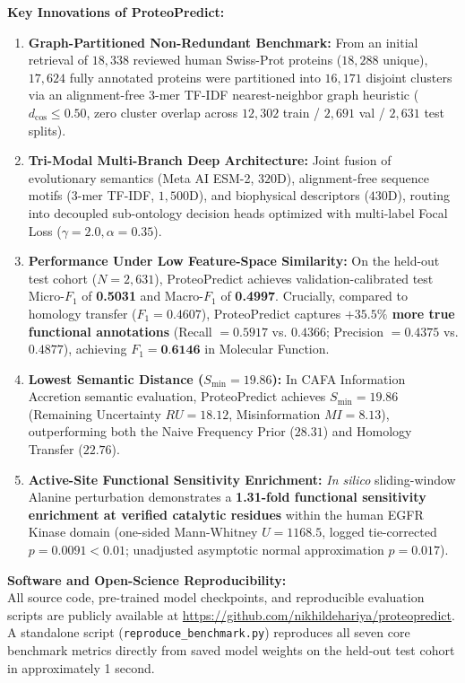 \documentclass[11pt]{article}
\begin{document}
\vspace{0.5em}
\noindent\textbf{Key Innovations of ProteoPredict:}
\begin{enumerate}
    \item \textbf{Graph-Partitioned Non-Redundant Benchmark:} From an initial retrieval of $18,338$ reviewed human Swiss-Prot proteins ($18,288$ unique), $17,624$ fully annotated proteins were partitioned into $16,171$ disjoint clusters via an alignment-free $3$-mer TF-IDF nearest-neighbor graph heuristic ($d_{\cos} \le 0.50$, zero cluster overlap across $12,302$ train / $2,691$ val / $2,631$ test splits).
    \item \textbf{Tri-Modal Multi-Branch Deep Architecture:} Joint fusion of evolutionary semantics (Meta AI ESM-2, $320\text{D}$), alignment-free sequence motifs ($3$-mer TF-IDF, $1,500\text{D}$), and biophysical descriptors ($430\text{D}$), routing into decoupled sub-ontology decision heads optimized with multi-label Focal Loss ($\gamma = 2.0, \alpha = 0.35$).
    \item \textbf{Performance Under Low Feature-Space Similarity:} On the held-out test cohort ($N=2,631$), ProteoPredict achieves validation-calibrated test Micro-$F_1$ of \textbf{0.5031} and Macro-$F_1$ of \textbf{0.4997}. Crucially, compared to homology transfer ($F_1 = 0.4607$), ProteoPredict captures \textbf{$+35.5\%$ more true functional annotations} (Recall $= 0.5917$ vs. $0.4366$; Precision $= 0.4375$ vs. $0.4877$), achieving $F_1 = \textbf{0.6146}$ in Molecular Function.
    \item \textbf{Lowest Semantic Distance ($S_{\min} = 19.86$):} In CAFA Information Accretion semantic evaluation, ProteoPredict achieves $S_{\min} = 19.86$ (Remaining Uncertainty $RU = 18.12$, Misinformation $MI = 8.13$), outperforming both the Naive Frequency Prior ($28.31$) and Homology Transfer ($22.76$).
    \item \textbf{Active-Site Functional Sensitivity Enrichment:} \textit{In silico} sliding-window Alanine perturbation demonstrates a \textbf{1.31-fold functional sensitivity enrichment at verified catalytic residues} within the human EGFR Kinase domain (one-sided Mann-Whitney $U = 1168.5$, logged tie-corrected $p = 0.0091 < 0.01$; unadjusted asymptotic normal approximation $p = 0.017$).
\end{enumerate}

\vspace{0.5em}
\noindent\textbf{Software and Open-Science Reproducibility:}\\
All source code, pre-trained model checkpoints, and reproducible evaluation scripts are publicly available at \url{https://github.com/nikhildehariya/proteopredict}. A standalone script (\texttt{reproduce\_benchmark.py}) reproduces all seven core benchmark metrics directly from saved model weights on the held-out test cohort in approximately 1 second.
\end{document}
